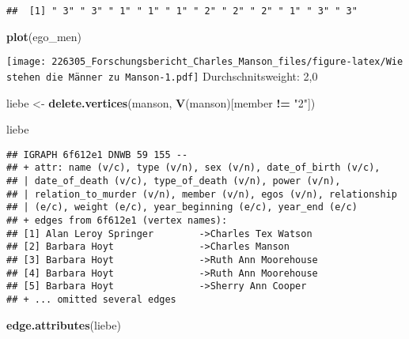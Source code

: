 \documentclass[
]{article}
\newenvironment{Shaded}{\begin{snugshade}}{\end{snugshade}}
\newcommand{\KeywordTok}[1]{\textcolor[rgb]{0.13,0.29,0.53}{\textbf{#1}}}
\newcommand{\NormalTok}[1]{#1}
\newcommand{\OperatorTok}[1]{\textcolor[rgb]{0.81,0.36,0.00}{\textbf{#1}}}
\newcommand{\StringTok}[1]{\textcolor[rgb]{0.31,0.60,0.02}{#1}}
\begin{document}
\begin{verbatim}
##  [1] " 3" " 3" " 1" " 1" " 1" " 2" " 2" " 2" " 1" " 3" " 3"
\end{verbatim}

\begin{Shaded}
\begin{Highlighting}[]
\KeywordTok{plot}\NormalTok{(ego_men)}
\end{Highlighting}
\end{Shaded}

\texttt{[image: 226305\_Forschungsbericht\_Charles\_Manson\_files/figure-latex/Wie stehen die Männer zu Manson-1.pdf]}
Durchschnitsweight: 2,0

\begin{Shaded}
\begin{Highlighting}[]
\NormalTok{liebe <-}\StringTok{ }\KeywordTok{delete.vertices}\NormalTok{(manson, }\KeywordTok{V}\NormalTok{(manson)[member }\OperatorTok{!=}\StringTok{ "2"}\NormalTok{])}

\NormalTok{liebe}
\end{Highlighting}
\end{Shaded}

\begin{verbatim}
## IGRAPH 6f612e1 DNWB 59 155 -- 
## + attr: name (v/c), type (v/n), sex (v/n), date_of_birth (v/c),
## | date_of_death (v/c), type_of_death (v/n), power (v/n),
## | relation_to_murder (v/n), member (v/n), egos (v/n), relationship
## | (e/c), weight (e/c), year_beginning (e/c), year_end (e/c)
## + edges from 6f612e1 (vertex names):
## [1] Alan Leroy Springer        ->Charles Tex Watson 
## [2] Barbara Hoyt               ->Charles Manson     
## [3] Barbara Hoyt               ->Ruth Ann Moorehouse
## [4] Barbara Hoyt               ->Ruth Ann Moorehouse
## [5] Barbara Hoyt               ->Sherry Ann Cooper  
## + ... omitted several edges
\end{verbatim}

\begin{Shaded}
\begin{Highlighting}[]
\KeywordTok{edge.attributes}\NormalTok{(liebe)}
\end{Highlighting}
\end{Shaded}
\end{document}
